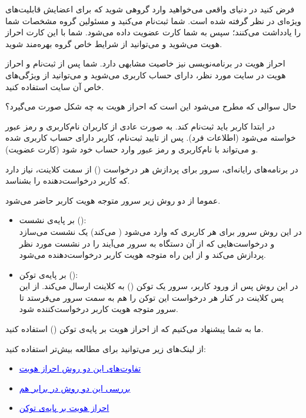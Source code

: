 \documentclass[]{article}
\begin{document}
فرض کنید در دنیای واقعی می‌خواهید وارد گروهی شوید که برای اعضایش قابلیت‌های ویژه‌ای در نظر گرفته شده است. شما ثبت‌نام می‌کنید و مسئولین گروه مشخصات شما را یادداشت می‌کنند؛ سپس به شما کارت عضویت داده می‌شود. شما با این کارت احراز هویت می‌شوید و می‌توانید از شرایط خاص گروه بهره‌مند شوید.

احراز هویت در برنامه‌نویسی نیز خاصیت مشابهی دارد. شما پس از ثبت‌نام و احراز هویت در سایت مورد نظر، دارای حساب کاربری می‌شوید و می‌توانید از ویژگی‌های خاص آن سایت استفاده کنید.

حال سوالی که مطرح می‌شود این است که احراز هویت به چه شکل صورت می‌گیرد؟

در ابتدا کاربر باید ثبت‌نام کند. به صورت عادی از کاربران نام‌کاربری و رمز عبور خواسته می‌شود (اطلاعات فرد). پس از تایید ثبت‌نام، کاربر دارای حساب کاربری شده و می‌تواند با نام‌کاربری و رمز عبور وارد حساب خود شود (کارت عضویت).

در برنامه‌‌های رایانه‌ای، سرور برای پردازش هر درخواست () از سمت کلاینت، نیاز دارد که کاربر درخواست‌دهنده را بشناسد.

عموما از دو روش زیر سرور متوجه هویت کاربر حاضر می‌شود.


\begin{itemize}
    \item بر پایه‌ی نشست (): \\
    در این روش سرور برای هر کاربری که وارد می‌شود ( می‌کند) یک نشست می‌سازد و درخواست‌هایی که از آن دستگاه به سرور می‌آیند را در نشست مورد نظر پردازش می‌کند و از این راه متوجه هویت کاربر درخواست‌دهنده می‌شود.
    \item بر پایه‌ی توکن (): \\
    در این روش پس از ورود کاربر، سرور یک توکن () به کلاینت ارسال می‌کند. از این پس کلاینت در کنار هر درخواست این توکن را هم به سمت سرور می‌فرستد تا سرور متوجه هویت کاربر درخواست‌کننده شود.
\end{itemize}

ما به شما پیشنهاد می‌کنیم که از احراز هویت بر پایه‌ی توکن () استفاده کنید.

از لینک‌های زیر می‌توانید برای مطالعه بیش‌تر استفاده کنید:

\begin{itemize}
    \item \href{https://dev.to/thecodearcher/what-really-is-the-difference-between-session-and-token-based-authentication-2o39}{\textcolor{blue}{\underline{تفاوت‌های این دو روش احراز هویت}}}
    \item \href{https://sherryhsu.medium.com/session-vs-token-based-authentication-11a6c5ac45e4}{\textcolor{blue}{\underline{بررسی این دو روش در برابر هم}}}
    \item \href{https://www.okta.com/identity-101/what-is-token-based-authentication/}{\textcolor{blue}{\underline{احراز هویت بر پایه‌ی توکن}}}
\end{itemize}
\end{document}
